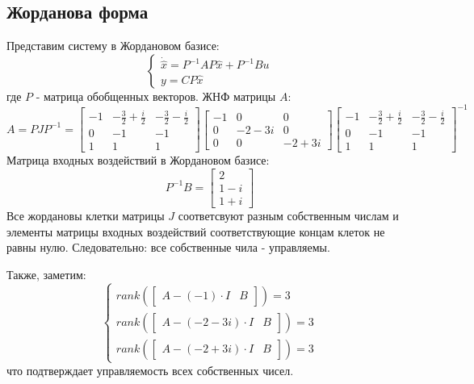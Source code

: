 \subsection{Жорданова форма}
Представим систему в Жордановом базисе:
\begin{equation}
    \begin{cases}
        \dot{\hat{x}} = P^{-1}AP\hat{x} + P^{-1}Bu  \\
        y = CP\hat{x}
    \end{cases}
\end{equation}
где $P$ - матрица обобщенных векторов. ЖНФ матрицы $A$:
\begin{equation*}
    A = PJP^{-1} = \begin{bmatrix}
        -1 & -\frac{3}{2} + \frac{i}{2} & -\frac{3}{2}-\frac{i}{2} \\
        0 & -1 & -1 \\
        1 & 1 & 1
    \end{bmatrix}
    \begin{bmatrix}
        -1 & 0 & 0 \\
        0 & -2-3i & 0 \\
        0 & 0 & -2+3i
    \end{bmatrix}
    \begin{bmatrix}
        -1 & -\frac{3}{2} + \frac{i}{2} & -\frac{3}{2}-\frac{i}{2} \\
        0 & -1 & -1 \\
        1 & 1 & 1
    \end{bmatrix}^{-1}
\end{equation*}
Матрица входных воздействий в Жордановом базисе:
\begin{equation*}
    P^{-1}B = \begin{bmatrix}
        2 \\ 1-i \\ 1+i
    \end{bmatrix}
\end{equation*}
Все жордановы клетки матрицы $J$ соответсвуют разным собственным числам и элементы матрицы входных воздействий
соответствующие концам клеток не равны нулю. Следовательно: все собственные чила - управляемы.

Также, заметим:
\begin{equation*}
    \begin{cases}
        rank(\begin{bmatrix}
            A - (-1)\cdot I &  B
        \end{bmatrix} ) = 3 \\
        rank(\begin{bmatrix}
            A - (-2-3i)\cdot I &  B
        \end{bmatrix} ) = 3 \\
        rank(\begin{bmatrix}
            A - (-2+3i)\cdot I &  B
        \end{bmatrix} ) = 3
    \end{cases}
\end{equation*}
что подтверждает управляемость всех собственных чисел.

